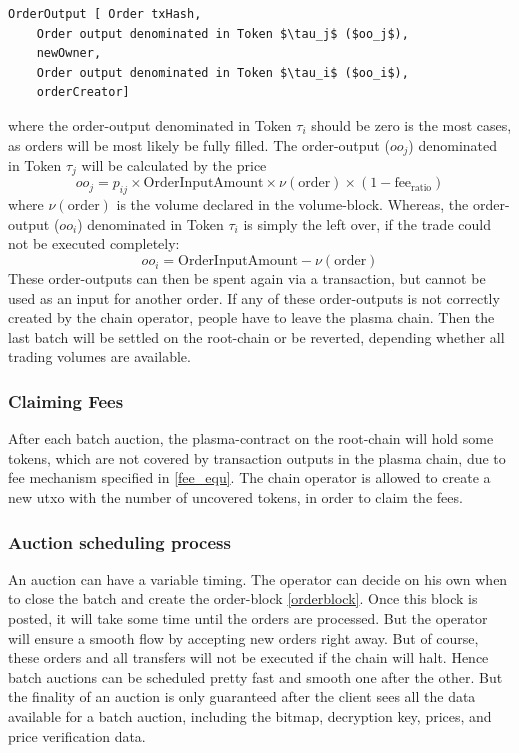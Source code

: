 \documentclass[11pt,parskip=full]{scrartcl}%
\begin{document}
\begin{lstlisting}
OrderOutput [ Order txHash,
    Order output denominated in Token $\tau_j$ ($oo_j$), 
    newOwner,
    Order output denominated in Token $\tau_i$ ($oo_i$),
    orderCreator]

\end{lstlisting}
where the order-output denominated in Token $\tau_i$ should be zero is the most cases, as orders will be most likely be fully filled. 
The order-output ($oo_j$) denominated in Token $\tau_j$ will be calculated by the price 
\begin{equation}
  oo_j = p_{ij} \times \text{OrderInputAmount} \times \nu(\text{order}) \times (1-\text{fee}_{\text{ratio}})
    \label{fee_equ}
\end{equation}
where $\nu(\text{order})$ is the volume declared in the volume-block.  
Whereas, the order-output ($oo_i$) denominated in Token $\tau_i$ is simply the left over, if the trade could not be executed completely: 
\begin{equation}
  oo_i =  \text{OrderInputAmount} - \nu(\text{order})
\end{equation}
These order-outputs can then be spent again via a transaction, but cannot be used as an input for another order. 
If any of these order-outputs is not correctly created by the chain operator, people have to leave the plasma chain. 
Then the last batch will be settled on the root-chain or be reverted, depending whether all trading volumes are available. 

\subsubsection{Claiming Fees}
After each batch auction, the plasma-contract on the root-chain will hold some tokens, which are not covered by transaction outputs in the plasma chain, due to fee mechanism specified in \ref{fee_equ}. 
The chain operator is allowed to create a new utxo with the number of uncovered tokens, in order to claim the fees. 

\subsubsection{Auction scheduling process}

An auction can have a variable timing. 
The operator can decide on his own when to close the batch and create the order-block \ref{orderblock}. 
Once this block is posted, it will take some time until the orders are processed. 
But the operator will ensure a smooth flow by accepting new orders right away. 
But of course, these orders and all transfers will not be executed if the chain will halt. 
Hence batch auctions can be scheduled pretty fast and smooth one after the other. 
But the finality of an auction is only guaranteed after the client sees all the data available for a batch auction, including the bitmap, decryption key, prices, and price verification data. 
\end{document}
